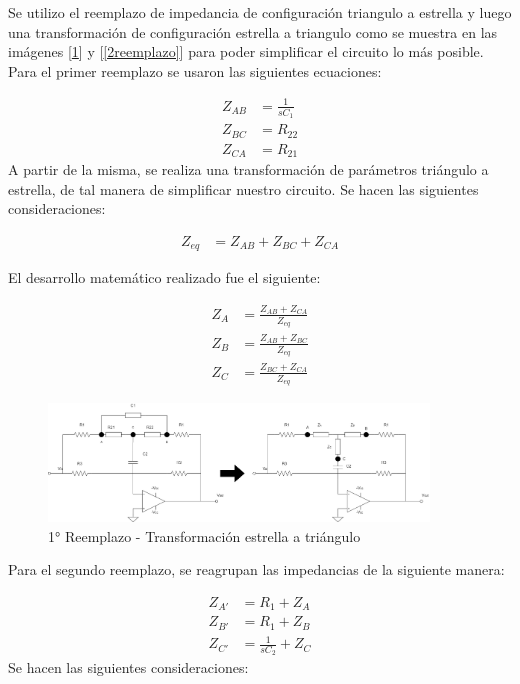 Se utilizo el reemplazo de impedancia de configuración 
triangulo a estrella y luego una transformación de configuración
 estrella a triangulo como se muestra en las imágenes [\ref{1reemplazo}]
  y [\ref{2reemplazo}]  para poder simplificar el circuito lo más posible.
Para el primer reemplazo se usaron las siguientes ecuaciones:

\begin{align*}
		Z_{AB} &= \frac{1}{sC_1} \\
		Z_{BC} &= R_{22} \\
		Z_{CA} &= R_{21}
\end{align*}
A partir de la misma, se realiza una transformación de parámetros triángulo
a estrella, de tal manera de simplificar nuestro circuito.
 Se hacen las 
siguientes consideraciones:

\begin{align*}
	Z_{eq} &= Z_{AB} + Z_{BC} + Z_{CA}
\end{align*}

El desarrollo matemático realizado fue el siguiente: \par 

\begin{align}
	Z_{A} &= \frac{Z_{AB}+Z_{CA}}{Z_{eq}} \\
	Z_{B} &= \frac{Z_{AB}+Z_{BC}}{Z_{eq}}  \\
	Z_{C} &= \frac{Z_{BC}+Z_{CA}}{Z_{eq}} 
\end{align}


\begin{figure}[H]

	\centering
	\includegraphics[width=0.9\textwidth]{../Ejercicio4-EcualizadorDeFase/Informe/1cambioEstrella.png}
	\caption{1° Reemplazo - Transformación estrella a triángulo}
	\label{1reemplazo} 
\end{figure}


Para el segundo reemplazo, se reagrupan las impedancias
 de la siguiente manera:

\begin{align}
		Z_{A'} &= R_1 + Z_{A} \\
		Z_{B'} &= R_1 + Z_{B} \\
		Z_{C'} &= \frac{1}{sC_2} + Z_{C}
\end{align}
Se hacen las 
siguientes consideraciones:

